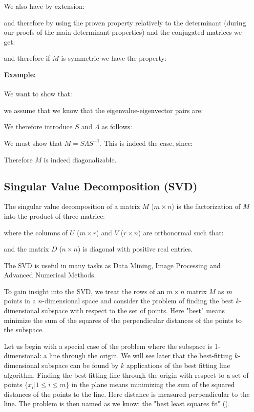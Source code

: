 	We also have by extension:
	
	and therefore by using the proven property relatively to the determinant (during our proofs of the main determinant properties) and  the conjugated matrices we get:
	
	and therefore if $M$ is symmetric we have the property:
	
	
	\begin{tcolorbox}[colframe=black,colback=white,sharp corners]
	\textbf{{\Large {}}Example:}\\\\
	We want to show that:
	
	we assume that we know that the eigenvalue-eigenvector pairs are:
	
	We therefore introduce $S$ and $\Lambda$ as follows:
	
	We must show that $M=S\Lambda S^{-1}$. This is indeed the case, since:
	
	Therefore $M$ is indeed diagonalizable.
	\end{tcolorbox}
	
	\pagebreak
	\subsection{Singular Value Decomposition (SVD)}
	The singular value decomposition of a matrix $M$ ($m\times n$) is the factorization of $M$ into the product of three matrice:
	
	where the columns of $U$ ($m\times r$) and $V$ ($r\times n$) are orthonormal such that:
	
	and the matrix $D$ ($n\times n$) is diagonal with positive real entries. 

	The SVD is useful in many tasks as Data Mining, Image Processing and Advanced Numerical Methods.

	To gain insight into the SVD, we treat the rows of an $m\times n$ matrix $M$ as $m$ points in a $n$-dimensional space and consider the problem of finding the best $k$-dimensional subspace with respect to the set of points. Here "best" means minimize the sum of the squares of the perpendicular distances of the points to the subspace. 

	Let us begin with a special case of the problem where the subspace is 1-dimensional: a line through the origin. We will see later that the best-fitting $k$-dimensional subspace can be found by $k$ applications of the best fitting line algorithm. Finding the best fitting line through the origin with respect to a set of points $\{x_i|1 \leq i \leq m\}$ in the plane means minimizing the sum of the squared distances of the points to the line. Here distance is measured perpendicular to the line. The problem is then named as we know: the "best least squares fit" ().
	
